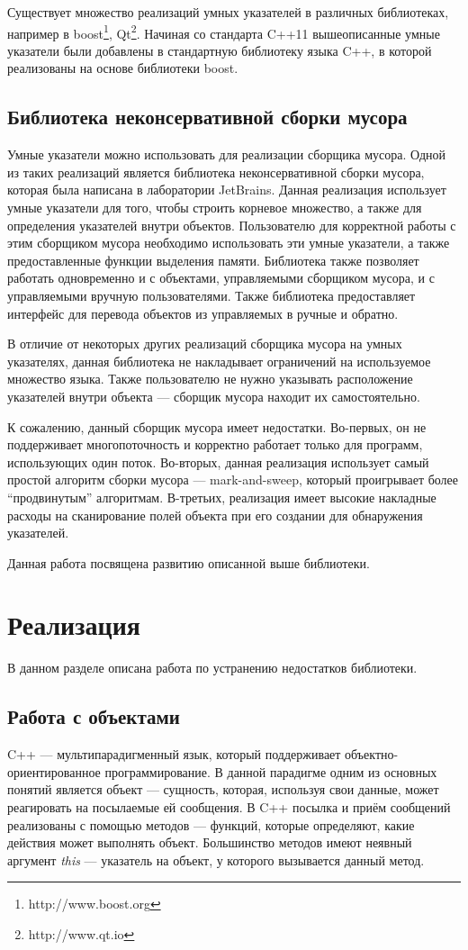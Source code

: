\documentclass[14pt]{matmex-diploma}
\begin{document}
Существует множество реализаций умных указателей в различных библиотеках, например в boost\footnote{http://www.boost.org}, Qt\footnote{http://www.qt.io}. Начиная со стандарта C++11 вышеописанные умные указатели были добавлены в стандартную библиотеку языка C++, в которой реализованы на основе библиотеки boost.

\subsection{Библиотека неконсервативной сборки мусора}
Умные указатели можно использовать для реализации сборщика мусора. Одной из таких реализаций является библиотека неконсервативной сборки мусора, которая была написана в лаборатории JetBrains.
Данная реализация использует умные указатели для того, чтобы строить корневое множество, а также для определения указателей внутри объектов. Пользователю для корректной работы с этим сборщиком мусора необходимо использовать эти умные указатели, а также предоставленные функции выделения памяти.
Библиотека также позволяет работать одновременно и с объектами, управляемыми сборщиком мусора, и с управляемыми вручную пользователями. Также библиотека предоставляет интерфейс для перевода объектов из управляемых в ручные и обратно.

В отличие от некоторых других реализаций сборщика мусора на умных указателях, данная библиотека не накладывает ограничений на используемое множество языка.
Также пользователю не нужно указывать расположение указателей внутри объекта --- сборщик мусора находит их самостоятельно.

К сожалению, данный сборщик мусора имеет недостатки. Во-первых, он не поддерживает многопоточность и корректно работает только для программ, использующих один поток. Во-вторых, данная реализация использует самый простой алгоритм сборки мусора --- mark-and-sweep, который проигрывает более ``продвинутым'' алгоритмам.
В-третьих, реализация имеет высокие накладные расходы на сканирование полей объекта при его создании для обнаружения указателей.

Данная работа посвящена развитию описанной выше библиотеки.


\section{Реализация}
В данном разделе описана работа по устранению недостатков библиотеки.
\subsection{Работа с объектами}
C++ --- мультипарадигменный язык, который поддерживает
объектно-ориентированное программирование. В данной парадигме одним из основных
понятий является объект --- сущность, которая, используя свои данные, может реагировать
на посылаемые ей сообщения. В C++ посылка и приём сообщений реализованы с помощью методов --- 
функций, которые определяют, какие действия может выполнять объект. 
Большинство методов имеют неявный аргумент \textit{this} --- указатель на объект,
у которого вызывается данный метод. 
\end{document}
